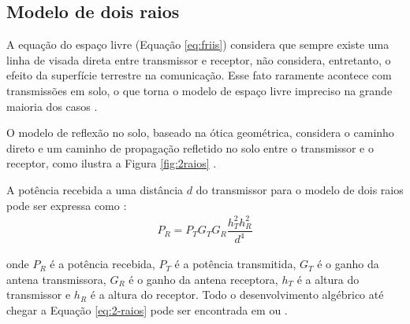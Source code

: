 \subsection{Modelo de dois raios}
\label{sub:modelo-2-raios}

A equação do espaço livre (Equação \ref{eq:friis}) considera que sempre existe uma linha de visada direta entre transmissor e receptor, não considera, entretanto, o efeito da superfície terrestre na comunicação. Esse fato raramente acontece com transmissões em solo, o que torna o modelo de espaço livre impreciso na grande maioria dos casos \cite{rappaport2009}.

O modelo de reflexão no solo, baseado na ótica geométrica, considera o caminho direto e um caminho de propagação refletido no solo entre o transmissor e o receptor, como ilustra a Figura \ref{fig:2raios} \cite{rappaport2009}.
\begin{figure}[H]
	\centering
\end{figure}

A potência recebida a uma distância $d$ do transmissor para o modelo de dois raios pode ser expressa como \cite{rappaport2009}:
\begin{equation}
	\begin{aligned}
	\label{eq:2-raios}
		P_R = P_TG_TG_R\dfrac{h^2_Th^2_R}{d^4}
	\end{aligned}
\end{equation}

\noindent onde $P_R$ é a potência recebida, $P_T$ é a potência transmitida, $G_T$ é o ganho da antena transmissora, $G_R$ é o ganho da antena receptora, $h_T$ é a altura do transmissor e $h_R$ é a altura do receptor. Todo o desenvolvimento algébrico até chegar a Equação \ref{eq:2-raios} pode ser encontrada em  ou .

